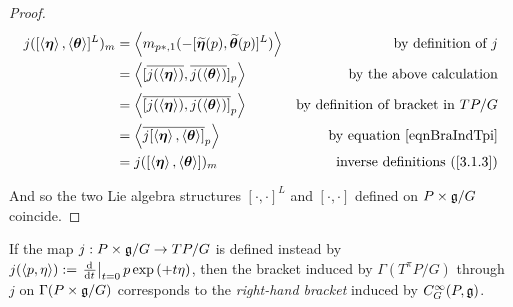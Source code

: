 \begin{proof}
\begin{align*}
    j([\left\langle \bm{\eta} \right\rangle, \left\langle \bm{\theta} \right\rangle]^L)_m 
    &= \left\langle m_{p*, 1} (-[\widetilde{\bm{\eta}}(p), \widetilde{\bm{\theta}}(p)]^L) \right\rangle & \textrm{by definition of $j$} \\ 
    &= \left\langle [\overline{j(\left\langle \bm{\eta} \right\rangle)}, \overline{j(\left\langle \bm{\theta} \right\rangle)}]_p \right\rangle & \textrm{by the above calculation}\\
    &= \left\langle \overline{[j(\left\langle \bm{\eta} \right\rangle), j(\left\langle \bm{\theta} \right\rangle)]}_p \right\rangle & \textrm{by definition of bracket in $TP/G$}\\
    &= \left\langle \overline{j[\left\langle \bm{\eta} \right\rangle, \left\langle \bm{\theta} \right\rangle]}_p \right\rangle & \textrm{by equation \eqref{eqnBraIndTpi}} \\
    &= j([\left\langle \bm{\eta} \right\rangle, \left\langle \bm{\theta} \right\rangle])_m & \textrm{inverse definitions (\ref{3.1.3})}
\end{align*}

And so the two Lie algebra structures $[\cdot, \cdot]^L$ and $[\cdot, \cdot]$ defined on $P \times \mathfrak{g}/G$ coincide.
\end{proof}
\begin{remark}
If the map $j: P \times \mathfrak{g}/G \to TP/G$ is defined instead by $j(\cl{p, \eta}) := \der{t}[t = 0] p \exp{(+t \eta)}$, then the bracket induced by $\Gamma(T^\pi P/G)$ through $j$ on $\Gamma(P \times \mathfrak{g}/G)$ corresponds to the \emph{right-hand bracket} induced by $C^\infty_G(P, \mathfrak{g})$.
\end{remark}


